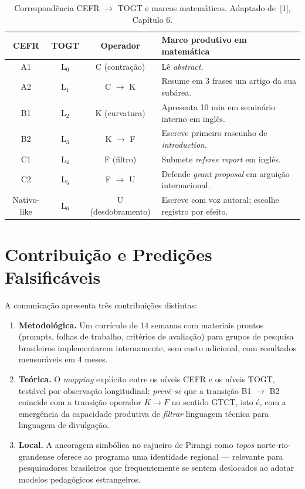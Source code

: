 \documentclass[11pt,a4paper]{article}
\begin{document}
\begin{table}[h]
\centering
\small
\begin{tabular}{@{}cccl@{}}
\toprule
CEFR & TOGT & Operador & Marco produtivo em matemática \\
\midrule
A1 & L$_0$ & C (contração) & Lê \emph{abstract}. \\
A2 & L$_1$ & C $\to$ K & Resume em 3 frases um artigo da sua subárea. \\
B1 & L$_2$ & K (curvatura) & Apresenta 10 min em seminário interno em inglês. \\
B2 & L$_3$ & K $\to$ F & Escreve primeiro rascunho de \emph{introduction}. \\
C1 & L$_4$ & F (filtro) & Submete \emph{referee report} em inglês. \\
C2 & L$_5$ & F $\to$ U & Defende \emph{grant proposal} em arguição internacional. \\
Nativo-like & L$_6$ & U (desdobramento) & Escreve com voz autoral; escolhe registro por efeito. \\
\bottomrule
\end{tabular}
\caption{Correspondência CEFR $\to$ TOGT e marcos matemáticos. Adaptado de~[1], Capítulo 6.\label{tab:cefr}}
\end{table}

\section*{Contribuição e Predições Falsificáveis}

A comunicação apresenta três contribuições distintas:

\begin{enumerate}[leftmargin=2em,itemsep=0.2em]
  \item \textbf{Metodológica.} Um currículo de 14 semanas com materiais prontos (prompts, folhas de trabalho, critérios de avaliação) para grupos de pesquisa brasileiros implementarem internamente, sem custo adicional, com resultados mensuráveis em 4 meses.
  \item \textbf{Teórica.} O \emph{mapping} explícito entre os níveis CEFR e os níveis TOGT, testável por observação longitudinal: \emph{prevê-se} que a transição B1 $\to$ B2 coincide com a transição operador $K \to F$ no sentido GTCT, isto é, com a emergência da capacidade produtiva de \emph{filtrar} linguagem técnica para linguagem de divulgação.
  \item \textbf{Local.} A ancoragem simbólica no cajueiro de Pirangi como \emph{topos} norte-rio-grandense oferece ao programa uma identidade regional --- relevante para pesquisadores brasileiros que frequentemente se sentem deslocados ao adotar modelos pedagógicos estrangeiros.
\end{enumerate}
\end{document}
